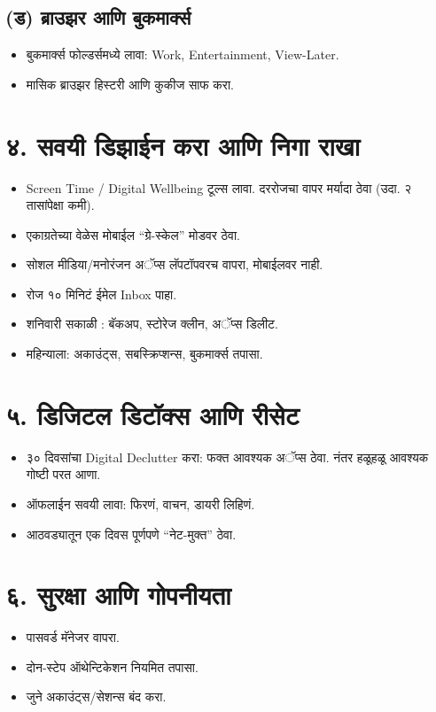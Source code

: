 \subsection*{(ड) ब्राउझर आणि बुकमार्क्स}
\begin{itemize}
  \item बुकमार्क्स फोल्डर्समध्ये लावा: Work, Entertainment, View-Later.  
  \item मासिक ब्राउझर हिस्टरी आणि कुकीज साफ करा.  
\end{itemize}

\section*{४. सवयी डिझाईन करा आणि निगा राखा}

\begin{itemize}
  \item Screen Time / Digital Wellbeing टूल्स लावा. दररोजचा वापर मर्यादा ठेवा (उदा. २ तासांपेक्षा कमी).  
  \item एकाग्रतेच्या वेळेस मोबाईल “ग्रे-स्केल” मोडवर ठेवा.  
  \item सोशल मीडिया/मनोरंजन अॅप्स लॅपटॉपवरच वापरा, मोबाईलवर नाही.  
  \item रोज १० मिनिटं ईमेल Inbox पाहा.  
  \item शनिवारी सकाळी : बॅकअप, स्टोरेज क्लीन, अॅप्स डिलीट.  
  \item महिन्याला: अकाउंट्स, सबस्क्रिप्शन्स, बुकमार्क्स तपासा.  
\end{itemize}

\section*{५. डिजिटल डिटॉक्स आणि रीसेट}

\begin{itemize}
  \item ३० दिवसांचा Digital Declutter करा: फक्त आवश्यक अॅप्स ठेवा. नंतर हळूहळू आवश्यक गोष्टी परत आणा.  
  \item ऑफलाईन सवयी लावा: फिरणं, वाचन, डायरी लिहिणं.  
  \item आठवड्यातून एक दिवस पूर्णपणे “नेट-मुक्त” ठेवा.  
\end{itemize}

\section*{६. सुरक्षा आणि गोपनीयता}

\begin{itemize}
  \item पासवर्ड मॅनेजर वापरा.  
  \item दोन-स्टेप ऑथेन्टिकेशन नियमित तपासा.  
  \item जुने अकाउंट्स/सेशन्स बंद करा.  
\end{itemize}

